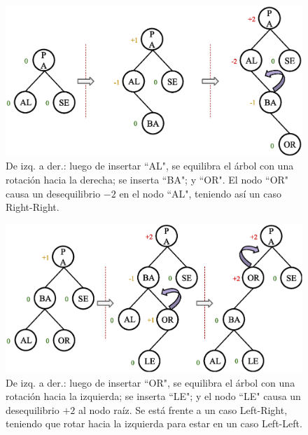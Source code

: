 \begin{figure}[htpb!]
  \begin{center}
    \includegraphics[width=1.0\textwidth]{images/AVLInsertion2.eps}
  \end{center}
  \caption{De izq. a der.: luego de insertar ``AL", se equilibra el árbol con una rotación hacia la derecha; se inserta ``BA"; y ``OR". El nodo ``OR" causa un desequilibrio $-2$ en el nodo ``AL", teniendo así un caso Right-Right.}
  \label{fig:AVLInsertion2}
\end{figure}

\begin{figure}[htpb!]
  \begin{center}
    \includegraphics[width=1.0\textwidth]{images/AVLInsertion3.eps}
  \end{center}
  \caption{De izq. a der.: luego de insertar ``OR", se equilibra el árbol con una rotación hacia la izquierda; se inserta ``LE"; y el nodo ``LE" causa un desequilibrio $+2$ al nodo raíz. Se está frente a un caso Left-Right, teniendo que rotar hacia la izquierda para estar en un caso Left-Left.}
  \label{fig:AVLInsertion3}
\end{figure}

